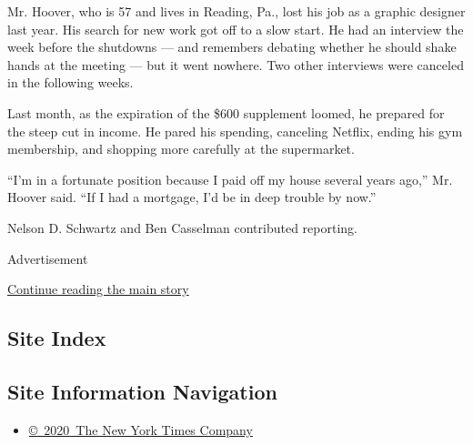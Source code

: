 Mr. Hoover, who is 57 and lives in Reading, Pa., lost his job as a
graphic designer last year. His search for new work got off to a slow
start. He had an interview the week before the shutdowns --- and
remembers debating whether he should shake hands at the meeting --- but
it went nowhere. Two other interviews were canceled in the following
weeks.

Last month, as the expiration of the \$600 supplement loomed, he
prepared for the steep cut in income. He pared his spending, canceling
Netflix, ending his gym membership, and shopping more carefully at the
supermarket.

``I'm in a fortunate position because I paid off my house several years
ago,'' Mr. Hoover said. ``If I had a mortgage, I'd be in deep trouble by
now.''

Nelson D. Schwartz and Ben Casselman contributed reporting.

Advertisement

\protect\hyperlink{after-bottom}{Continue reading the main story}

\hypertarget{site-index}{%
\subsection{Site Index}\label{site-index}}

\hypertarget{site-information-navigation}{%
\subsection{Site Information
Navigation}\label{site-information-navigation}}

\begin{itemize}
\tightlist
\item
  \href{https://help.nytimes.com/hc/en-us/articles/115014792127-Copyright-notice}{©~2020~The
  New York Times Company}
\end{itemize}

